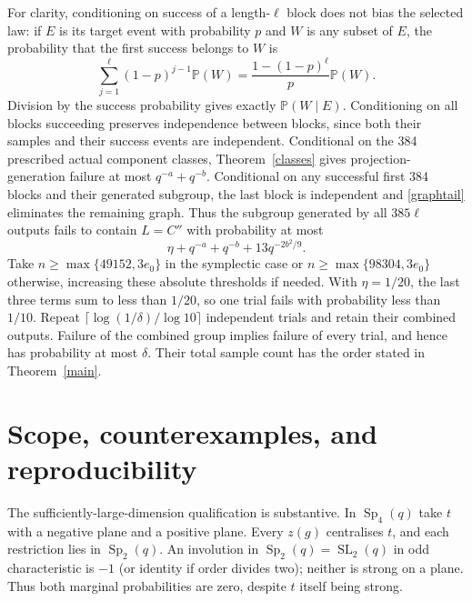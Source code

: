 \documentclass[11pt]{article}
\newcommand{\Sp}{\operatorname{Sp}}
\newcommand{\SL}{\operatorname{SL}}
\newcommand{\Prob}{\mathbb P}
\begin{document}
For clarity, conditioning on success of a length-$\ell$ block does not bias the selected law: if $E$ is its target event with probability $p$ and $W$ is any subset of $E$, the probability that the first success belongs to $W$ is
\[
\sum_{j=1}^{\ell}(1-p)^{j-1}\Prob(W)
=\frac{1-(1-p)^\ell}{p}\Prob(W).
\]
Division by the success probability gives exactly $\Prob(W\mid E)$. Conditioning on all blocks succeeding preserves independence between blocks, since both their samples and their success events are independent. Conditional on the 384 prescribed actual component classes, Theorem~\ref{classes} gives projection-generation failure at most $q^{-a}+q^{-b}$. Conditional on any successful first 384 blocks and their generated subgroup, the last block is independent and \eqref{graphtail} eliminates the remaining graph. Thus the subgroup generated by all $385\ell$ outputs fails to contain $L=C''$ with probability at most
\begin{equation}\label{failure}
\eta+q^{-a}+q^{-b}+13q^{-2b^2/9}.
\end{equation}
Take $n\ge\max\{49152,3e_0\}$ in the symplectic case or $n\ge\max\{98304,3e_0\}$ otherwise, increasing these absolute thresholds if needed. With $\eta=1/20$, the last three terms sum to less than $1/20$, so one trial fails with probability less than $1/10$. Repeat $\lceil\log(1/\delta)/\log10\rceil$ independent trials and retain their combined outputs. Failure of the combined group implies failure of every trial, and hence has probability at most $\delta$. Their total sample count has the order stated in Theorem~\ref{main}.

\section{Scope, counterexamples, and reproducibility}
The sufficiently-large-dimension qualification is substantive. In $\Sp_4(q)$ take $t$ with a negative plane and a positive plane. Every $z(g)$ centralises $t$, and each restriction lies in $\Sp_2(q)$. An involution in $\Sp_2(q)=\SL_2(q)$ in odd characteristic is $-1$ (or identity if order divides two); neither is strong on a plane. Thus both marginal probabilities are zero, despite $t$ itself being strong.
\end{document}
